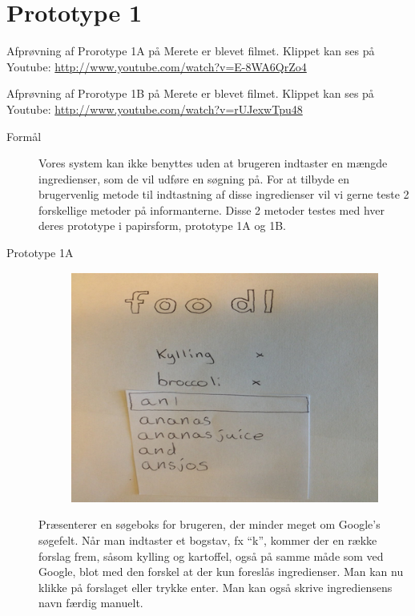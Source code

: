 \section{Prototype 1}

Afprøvning af Prorotype 1A på Merete er blevet filmet. Klippet kan ses på Youtube: \url{http://www.youtube.com/watch?v=E-8WA6QrZo4}

Afprøvning af Prorotype 1B på Merete er blevet filmet. Klippet kan ses på Youtube: \url{http://www.youtube.com/watch?v=rUJexwTpu48}

\begin{description}
\item[Formål] Vores system kan ikke benyttes uden at brugeren indtaster en mængde ingredienser, som de vil udføre en søgning på. For at tilbyde en brugervenlig metode til indtastning af disse ingredienser vil vi gerne teste 2 forskellige metoder på informanterne. Disse 2 metoder testes med hver deres prototype i papirsform, prototype 1A og 1B.
\item[Prototype 1A]

\begin{figure}[H]
\centering
\includegraphics[scale=0.7]{billeder/prototyper/prototype1a.png}
\label{fig:prototype1a}
\end{figure}

Præsenterer en søgeboks for brugeren, der minder meget om Google’s søgefelt. Når man indtaster et bogstav, fx “k”, kommer der en række forslag frem, såsom kylling og kartoffel, også på samme måde som ved Google, blot med den forskel at der kun foreslås ingredienser. Man kan nu klikke på forslaget eller trykke enter. Man kan også skrive ingrediensens navn færdig manuelt.


\end{description}
